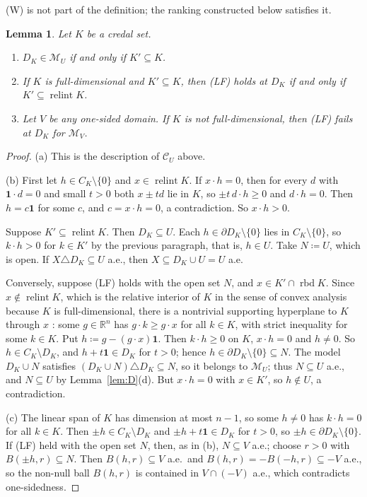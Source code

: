 \documentclass[11pt]{article}
\newcommand{\R}{\mathbb{R}}
\newcommand{\one}{\mathbf{1}}
\newcommand{\M}{\mathcal{M}}
\newcommand{\CC}{\mathcal{C}}
\DeclareMathOperator{\relint}{relint}
\DeclareMathOperator{\rbd}{rbd}
\theoremstyle{plain}
\newtheorem{lemma}[theorem]{Lemma}
\theoremstyle{definition}
\theoremstyle{remark}
\begin{document}
(W) is not part of the definition; the ranking constructed below satisfies it.

\begin{lemma}\label{lem:LF}
Let $K$ be a credal set.
\begin{enumerate}[label=(\alph*)]
  \item $D_K\in\M_U$ if and only if $K'\subseteq K$.
  \item If $K$ is full-dimensional and $K'\subseteq K$, then (LF) holds at $D_K$ if and
  only if $K'\subseteq\relint K$.
  \item Let $V$ be any one-sided domain. If $K$ is not full-dimensional, then (LF) fails
  at $D_K$ for $\M_V$.
\end{enumerate}
\end{lemma}

\begin{proof}
(a) This is the description of $\CC_U$ above.

(b) First let $h\in C_K\setminus\{0\}$ and $x\in\relint K$. If $x\cdot h=0$, then for
every $d$ with $\one\cdot d=0$ and small $t>0$ both $x\pm td$ lie in $K$, so $\pm t\,d
\cdot h\ge0$ and $d\cdot h=0$. Then $h=c\one$ for some $c$, and $c=x\cdot h=0$, a
contradiction. So $x\cdot h>0$.

Suppose $K'\subseteq\relint K$. Then $D_K\subseteq U$. Each $h\in\partial D_K\setminus
\{0\}$ lies in $C_K\setminus\{0\}$, so $k\cdot h>0$ for $k\in K'$ by the previous
paragraph, that is, $h\in U$. Take $N\coloneqq U$, which is open. If $X\triangle D_K
\subseteq U$ a.e., then $X\subseteq D_K\cup U=U$ a.e.

Conversely, suppose (LF) holds with the open set $N$, and $x\in K'\cap\rbd K$. Since
$x\notin\relint K$, which is the relative interior of $K$ in the sense of convex analysis
because $K$ is full-dimensional, there is a nontrivial supporting hyperplane to $K$
through $x$ \cite[Thm.~11.6]{Rockafellar}: some $g\in\R^n$ has $g\cdot k\ge g\cdot x$ for
all $k\in K$, with strict inequality for some $k\in K$. Put $h\coloneqq g-(g\cdot x)\one$.
Then $k\cdot h\ge0$ on $K$, $x\cdot h=0$ and $h\ne0$. So $h\in C_K\setminus D_K$, and
$h+t\one\in D_K$ for $t>0$; hence $h\in\partial D_K\setminus\{0\}\subseteq N$. The model
$D_K\cup N$ satisfies $(D_K\cup N)\triangle D_K\subseteq N$, so it belongs to $\M_U$;
thus $N\subseteq U$ a.e., and $N\subseteq U$ by Lemma~\ref{lem:D}(d). But $x\cdot h=0$
with $x\in K'$, so $h\notin U$, a contradiction.

(c) The linear span of $K$ has dimension at most $n-1$, so some $h\ne0$ has $k\cdot h=0$
for all $k\in K$. Then $\pm h\in C_K\setminus D_K$ and $\pm h+t\one\in D_K$ for $t>0$, so
$\pm h\in\partial D_K\setminus\{0\}$. If (LF) held with the open set $N$, then, as in (b),
$N\subseteq V$ a.e.; choose $r>0$ with $B(\pm h,r)\subseteq N$. Then $B(h,r)\subseteq V$
a.e.\ and $B(h,r)=-B(-h,r)\subseteq-V$ a.e., so the non-null ball $B(h,r)$ is contained
in $V\cap(-V)$ a.e., which contradicts one-sidedness.
\end{proof}
\end{document}
